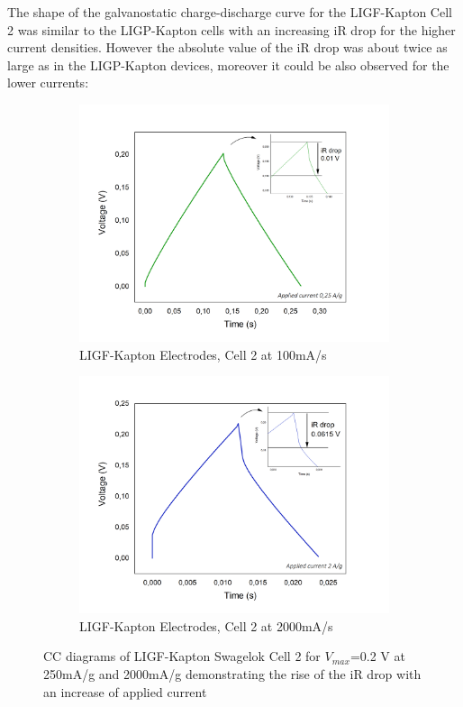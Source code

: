 The shape of the galvanostatic charge-discharge curve for the LIGF-Kapton Cell 2 was similar to the LIGP-Kapton cells with an increasing iR drop for the higher current densities. However the absolute value of the iR drop was about twice as large as in the LIGP-Kapton devices, moreover it could be also observed for the lower currents:

\begin{figure}[H]
\begin{subfigure}{0.49\textwidth}
\includegraphics[width=1\textwidth]{Figures/Results/Electrochemistry/LIGF-PI-NaNO3-Swagelok/Cell2/iR-Drop-Low-Current.jpg} 
\captionsetup{width=0.9\linewidth}
\caption{LIGF-Kapton Electrodes, Cell 2 at 100\:mA/s}
\label{fig:LIGF-PI-cell2-iRlow}
\end{subfigure}
\begin{subfigure}{0.49\textwidth}
\includegraphics[width=1\textwidth]{Figures/Results/Electrochemistry/LIGF-PI-NaNO3-Swagelok/Cell2/iR-Drop-High-Current.jpg}
\captionsetup{width=0.9\linewidth}
\caption{LIGF-Kapton Electrodes, Cell 2 at 2000\:mA/s}
\label{fig:LIGF-PI-cell2-iRhigh}
\end{subfigure}
\medskip
\caption{CC diagrams of LIGF-Kapton Swagelok Cell 2 for $V_{max}$=0.2 V at 250\:mA/g and 2000\:mA/g demonstrating the rise of the iR drop with an increase of applied current}
\label{fig:LIGF-PI-cell2-iR}
\end{figure}

